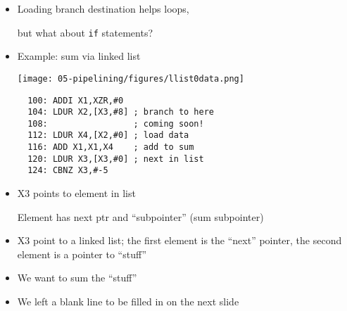 \ifnum{}
\begin{frame}[fragile]
  \begin{itemize}
  \item Loading branch destination helps loops,

    but what about \texttt{if} statements?
\item Example: sum via linked list
    \begin{center}
      \texttt{[image: 05-pipelining/figures/llist0data.png]}
      \end{center}
\begin{verbatim}
  100: ADDI X1,XZR,#0
  104: LDUR X2,[X3,#8] ; branch to here
  108:                 ; coming soon!
  112: LDUR X4,[X2,#0] ; load data
  116: ADD X1,X1,X4    ; add to sum
  120: LDUR X3,[X3,#0] ; next in list
  124: CBNZ X3,#-5
\end{verbatim}
\item X3 points to element in list

  Element has next ptr and ``subpointer'' (sum subpointer)
  \end{itemize}
\BNotes\ifnum{}
\begin{itemize}
\item X3 point to a linked list; the first element is the ``next'' pointer, the second element is a pointer to ``stuff''
\item We want to sum the ``stuff''
  \item We left a blank line to be filled in on the next slide
\end{itemize}
\fi\ENotes
\end{frame}
\fi

